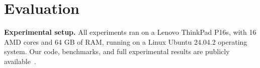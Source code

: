 \section{Evaluation}
\label{sec:evaluation}



\noindent
\textbf{Experimental setup.}
All experiments ran on a Lenovo ThinkPad P16s, with 16 AMD cores and 64 GB of RAM, running on a Linux Ubuntu 24.04.2 operating system.
%
%
Our code, benchmarks, and full experimental results are publicly available~\cite{ArtifactRepository}.
%
 



